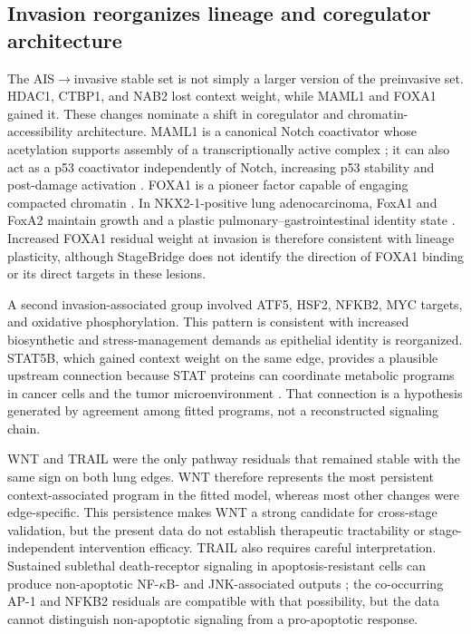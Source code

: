 \subsection{Invasion reorganizes lineage and coregulator architecture}

The AIS$\rightarrow$invasive stable set is not simply a larger version of the preinvasive set. HDAC1, CTBP1, and NAB2 lost context weight, while MAML1 and FOXA1 gained it. These changes nominate a shift in coregulator and chromatin-accessibility architecture. MAML1 is a canonical Notch coactivator whose acetylation supports assembly of a transcriptionally active complex \autocite{Jin2017-ph}; it can also act as a p53 coactivator independently of Notch, increasing p53 stability and post-damage activation \autocite{Zhao2007-xt}. FOXA1 is a pioneer factor capable of engaging compacted chromatin \autocite{Lerner2023-bx}. In NKX2-1-positive lung adenocarcinoma, FoxA1 and FoxA2 maintain growth and a plastic pulmonary--gastrointestinal identity state \autocite{Orstad2022-hw}. Increased FOXA1 residual weight at invasion is therefore consistent with lineage plasticity, although StageBridge does not identify the direction of FOXA1 binding or its direct targets in these lesions.

A second invasion-associated group involved ATF5, HSF2, NFKB2, MYC targets, and oxidative phosphorylation. This pattern is consistent with increased biosynthetic and stress-management demands as epithelial identity is reorganized. STAT5B, which gained context weight on the same edge, provides a plausible upstream connection because STAT proteins can coordinate metabolic programs in cancer cells and the tumor microenvironment \autocite{Li2023-tt}. That connection is a hypothesis generated by agreement among fitted programs, not a reconstructed signaling chain.

WNT and TRAIL were the only pathway residuals that remained stable with the same sign on both lung edges. WNT therefore represents the most persistent context-associated program in the fitted model, whereas most other changes were edge-specific. This persistence makes WNT a strong candidate for cross-stage validation, but the present data do not establish therapeutic tractability or stage-independent intervention efficacy. TRAIL also requires careful interpretation. Sustained sublethal death-receptor signaling in apoptosis-resistant cells can produce non-apoptotic NF-$\kappa$B- and JNK-associated outputs \autocite{Azijli2013-tr}; the co-occurring AP-1 and NFKB2 residuals are compatible with that possibility, but the data cannot distinguish non-apoptotic signaling from a pro-apoptotic response.

